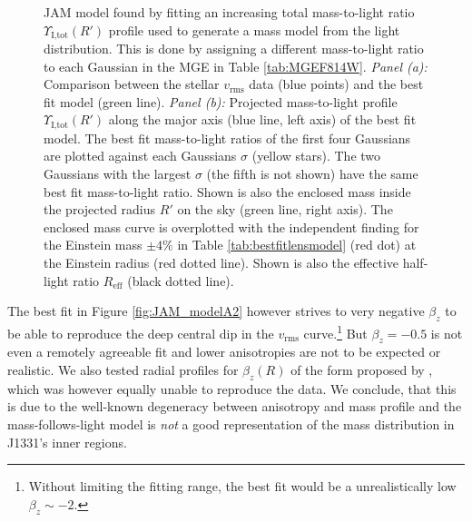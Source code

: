 \begin{figure}
\caption{JAM model found by fitting an increasing total mass-to-light ratio $\Upsilon_\text{I,tot}(R')$ profile used to generate a mass model from the light distribution.  This is done by assigning a different mass-to-light ratio to each Gaussian in the MGE in Table \ref{tab:MGEF814W}. \emph{Panel (a):} Comparison between the stellar $v_\text{rms}$ data (blue points) and the best fit model (green line). \emph{Panel (b):} Projected mass-to-light profile $\Upsilon_\text{I,tot}(R')$ along the major axis (blue line, left axis) of the best fit model. The best fit mass-to-light ratios of the first four Gaussians are plotted against each Gaussians $\sigma$ (yellow stars). The two Gaussians with the largest $\sigma$ (the fifth is not shown) have the same best fit mass-to-light ratio. Shown is also the enclosed mass inside the projected radius $R'$ on the sky (green line, right axis). The enclosed mass curve is overplotted with the independent finding for the Einstein mass $\pm 4 \%$ in Table \ref{tab:bestfitlensmodel} (red dot) at the Einstein radius (red dotted line). Shown is also the effective half-light ratio $R_\text{eff}$ (black dotted line). }
\label{fig:modelG}
\end{figure}


The best fit in Figure \ref{fig:JAM_modelA2} however strives to very negative $\beta_z$ to be able to reproduce the deep central dip in the  $v_\text{rms}$ curve.\footnote{Without limiting the fitting range, the best fit would be a unrealistically low $\beta_z \sim -2$.} But $\beta_z = -0.5$ is not even a remotely agreeable fit and lower anisotropies are not to be expected or realistic. We also tested radial profiles for $\beta_z(R)$ of the form proposed by \citet{BaesVanHese}, which was however equally unable to reproduce the data. We conclude, that this is due to the well-known degeneracy between anisotropy and mass profile \Wilma{[TO DO: REF]} and the mass-follows-light model is \emph{not} a good representation of the mass distribution in J1331's inner regions.


